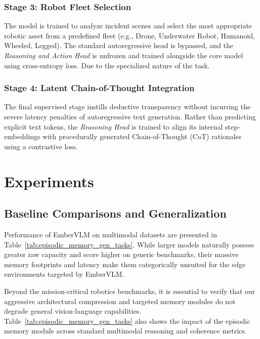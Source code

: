 \documentclass[runningheads]{llncs}
\begin{document}
\subsubsection{Stage 3: Robot Fleet Selection}
The model is trained to analyze incident scenes and select the most appropriate robotic asset from a predefined fleet (e.g., Drone, Underwater Robot, Humanoid, Wheeled, Legged). The standard autoregressive head is bypassed, and the \textit{Reasoning and Action Head} is unfrozen and trained alongside the core model using cross-entropy loss. Due to the specialized nature of the task.

\subsubsection{Stage 4: Latent Chain-of-Thought Integration}
The final supervised stage instills deductive transparency without incurring the severe latency penalties of autoregressive text generation. Rather than predicting explicit text tokens, the \textit{Reasoning Head} is trained to align its internal step-embeddings with procedurally generated Chain-of-Thought (CoT) rationales using a contrastive loss.

\section{Experiments}
\label{sec:experiments}
\subsection{Baseline Comparisons and Generalization}
\label{sec:baselines}

Performance of EmberVLM on multimodal datasets are presented in Table~\ref{tab:episodic_memory_gen_tasks}. While larger models naturally possess greater raw capacity and score higher on generic benchmarks, their massive memory footprints and latency make them categorically unsuited for the edge environments targeted by EmberVLM.

Beyond the mission-critical robotics benchmarks, it is essential to verify that our aggressive architectural compression and targeted memory modules do not degrade general vision-language capabilities. Table~\ref{tab:episodic_memory_gen_tasks} also shows the impact of the episodic memory module across standard multimodal reasoning and coherence metrics.
\end{document}
